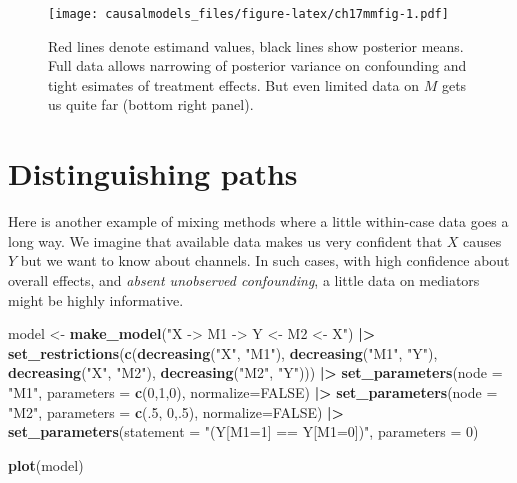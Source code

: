 \documentclass[
  12pt,
]{book}
\newenvironment{Shaded}{\begin{snugshade}}{\end{snugshade}}
\newcommand{\AttributeTok}[1]{\textcolor[rgb]{0.13,0.29,0.53}{#1}}
\newcommand{\ConstantTok}[1]{\textcolor[rgb]{0.56,0.35,0.01}{#1}}
\newcommand{\DecValTok}[1]{\textcolor[rgb]{0.00,0.00,0.81}{#1}}
\newcommand{\FunctionTok}[1]{\textcolor[rgb]{0.13,0.29,0.53}{\textbf{#1}}}
\newcommand{\NormalTok}[1]{#1}
\newcommand{\OtherTok}[1]{\textcolor[rgb]{0.56,0.35,0.01}{#1}}
\newcommand{\SpecialCharTok}[1]{\textcolor[rgb]{0.81,0.36,0.00}{\textbf{#1}}}
\newcommand{\StringTok}[1]{\textcolor[rgb]{0.31,0.60,0.02}{#1}}
\begin{document}
\begin{figure}
\centering
\texttt{[image: causalmodels\_files/figure-latex/ch17mmfig-1.pdf]}
\caption{\label{fig:ch17mmfig}Red lines denote estimand values, black lines show posterior means. Full data allows narrowing of posterior variance on confounding and tight esimates of treatment effects. But even limited data on \(M\) gets us quite far (bottom right panel).}
\end{figure}

\hypertarget{distinguishing-paths}{%
\section{Distinguishing paths}\label{distinguishing-paths}}

Here is another example of mixing methods where a little within-case data goes a long way. We imagine that available data makes us very confident that \(X\) causes \(Y\) but we want to know about channels. In such cases, with high confidence about overall effects, and \emph{absent unobserved confounding}, a little data on mediators might be highly informative.

\begin{Shaded}
\begin{Highlighting}[]
\NormalTok{model }\OtherTok{\textless{}{-}} \FunctionTok{make\_model}\NormalTok{(}\StringTok{"X {-}\textgreater{} M1 {-}\textgreater{} Y \textless{}{-} M2 \textless{}{-} X"}\NormalTok{) }\SpecialCharTok{|\textgreater{}}
  \FunctionTok{set\_restrictions}\NormalTok{(}\FunctionTok{c}\NormalTok{(}\FunctionTok{decreasing}\NormalTok{(}\StringTok{"X"}\NormalTok{, }\StringTok{"M1"}\NormalTok{), }
                     \FunctionTok{decreasing}\NormalTok{(}\StringTok{"M1"}\NormalTok{, }\StringTok{"Y"}\NormalTok{),}
                     \FunctionTok{decreasing}\NormalTok{(}\StringTok{"X"}\NormalTok{, }\StringTok{"M2"}\NormalTok{), }
                     \FunctionTok{decreasing}\NormalTok{(}\StringTok{"M2"}\NormalTok{, }\StringTok{"Y"}\NormalTok{))) }\SpecialCharTok{|\textgreater{}}
  \FunctionTok{set\_parameters}\NormalTok{(}\AttributeTok{node =} \StringTok{"M1"}\NormalTok{, }\AttributeTok{parameters =} \FunctionTok{c}\NormalTok{(}\DecValTok{0}\NormalTok{,}\DecValTok{1}\NormalTok{,}\DecValTok{0}\NormalTok{), }\AttributeTok{normalize=}\ConstantTok{FALSE}\NormalTok{)  }\SpecialCharTok{|\textgreater{}}
  \FunctionTok{set\_parameters}\NormalTok{(}\AttributeTok{node =} \StringTok{"M2"}\NormalTok{, }\AttributeTok{parameters =} \FunctionTok{c}\NormalTok{(.}\DecValTok{5}\NormalTok{, }\DecValTok{0}\NormalTok{,.}\DecValTok{5}\NormalTok{), }\AttributeTok{normalize=}\ConstantTok{FALSE}\NormalTok{)  }\SpecialCharTok{|\textgreater{}}
  \FunctionTok{set\_parameters}\NormalTok{(}\AttributeTok{statement =} \StringTok{"(Y[M1=1] == Y[M1=0])"}\NormalTok{, }\AttributeTok{parameters =} \DecValTok{0}\NormalTok{)  }

\FunctionTok{plot}\NormalTok{(model)}
\end{Highlighting}
\end{Shaded}
\end{document}
